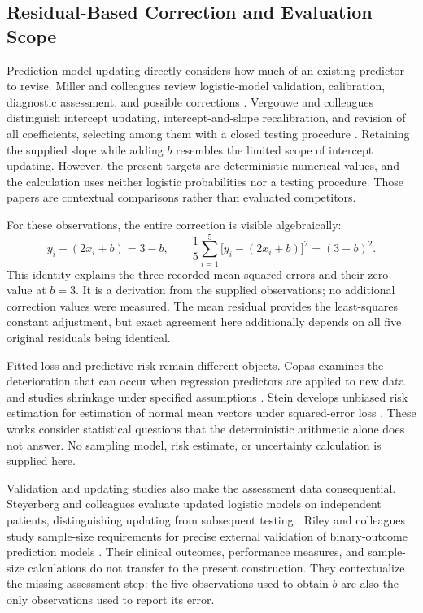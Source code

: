 \documentclass[11pt]{article}
\begin{document}
\subsection{Residual-Based Correction and Evaluation Scope}

Prediction-model updating directly considers how much of an existing predictor to revise. Miller and colleagues review logistic-model validation, calibration, diagnostic assessment, and possible corrections \cite{Miller1991ValidationTechniques}. Vergouwe and colleagues distinguish intercept updating, intercept-and-slope recalibration, and revision of all coefficients, selecting among them with a closed testing procedure \cite{Vergouwe2016ClosedTesting}. Retaining the supplied slope while adding $b$ resembles the limited scope of intercept updating. However, the present targets are deterministic numerical values, and the calculation uses neither logistic probabilities nor a testing procedure. Those papers are contextual comparisons rather than evaluated competitors.

For these observations, the entire correction is visible algebraically:
\[
y_i-(2x_i+b)=3-b,\qquad
\frac{1}{5}\sum_{i=1}^{5}\bigl[y_i-(2x_i+b)\bigr]^2=(3-b)^2.
\]
This identity explains the three recorded mean squared errors and their zero value at $b=3$. It is a derivation from the supplied observations; no additional correction values were measured. The mean residual provides the least-squares constant adjustment, but exact agreement here additionally depends on all five original residuals being identical.

Fitted loss and predictive risk remain different objects. Copas examines the deterioration that can occur when regression predictors are applied to new data and studies shrinkage under specified assumptions \cite{Copas1983RegressionPrediction}. Stein develops unbiased risk estimation for estimation of normal mean vectors under squared-error loss \cite{Stein1981EstimationMean}. These works consider statistical questions that the deterministic arithmetic alone does not answer. No sampling model, risk estimate, or uncertainty calculation is supplied here.

Validation and updating studies also make the assessment data consequential. Steyerberg and colleagues evaluate updated logistic models on independent patients, distinguishing updating from subsequent testing \cite{Steyerberg2004ValidationUpdating}. Riley and colleagues study sample-size requirements for precise external validation of binary-outcome prediction models \cite{Riley2021MinimumSample}. Their clinical outcomes, performance measures, and sample-size calculations do not transfer to the present construction. They contextualize the missing assessment step: the five observations used to obtain $b$ are also the only observations used to report its error.
\end{document}
